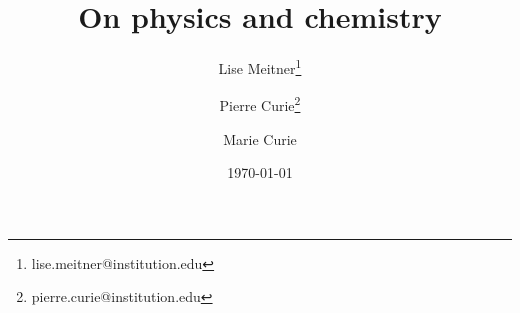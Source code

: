 \usepackage{authblk}
%
\title{On physics and chemistry}
%
\author[1,2,3]{Lise Meitner\thanks{lise.meitner@institution.edu}}
\author[4]{Pierre Curie\thanks{pierre.curie@institution.edu}}
\author[5,6,4]{Marie Curie}
%
\date{\today}